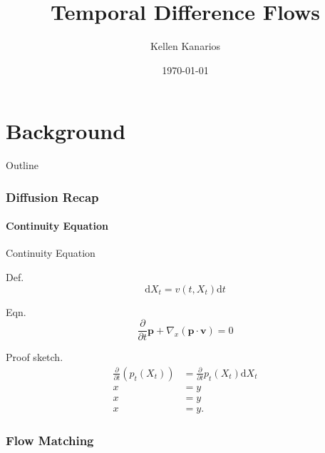 \documentclass{beamer}
\title{Temporal Difference Flows \cite{farebrotherTemporalDifferenceFlows2025}}
\author{Kellen Kanarios}
\date{\today}
\begin{document}
\begin{frame}
    \titlepage 
\end{frame}

\part{Background}

\begin{frame}{Outline}
    \tableofcontents
\end{frame}

\section{Diffusion Recap}
\subsection{Continuity Equation}
\begin{frame}{Continuity Equation}
    \begin{minipage}{0.5\textwidth}
        \begin{block}{Def.}
            \vspace*{-.5cm}
            \[ \mathrm{d}X_t = v(t, X_t)\mathrm{d}t \]
        \end{block}
    \end{minipage}
    \begin{block}{Eqn.}
        \vspace*{-.5cm}
        \begin{equation}\label{eqn:continuity}
            \frac{\partial}{\partial t}\boldsymbol{p} + \nabla_x (\boldsymbol{p} \cdot \boldsymbol{v}) = 0
        \end{equation}
    \end{block}
    \begin{exampleblock}{Proof sketch.}
        \vspace*{-0.8cm}
        \begin{align}
            \frac{\partial}{\partial t}(p_t(X_t)) &= \frac{\partial}{\partial t} p_t(X_t) \mathrm{d}X_t \\
            x &= y \\
            x &= y \\
            x &= y
        .\end{align}
    \end{exampleblock}
\end{frame}
\section{Flow Matching}
\end{document}
